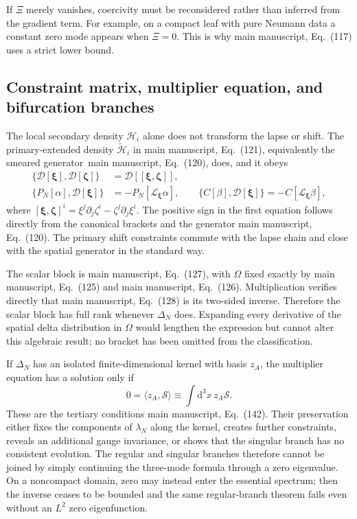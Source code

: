 \documentclass[aps,prd,reprint,onecolumn,notitlepage,nofootinbib,longbibliography,floatfix]{revtex4-2}
\theoremstyle{scstyle}
\theoremstyle{definition}
\theoremstyle{remark}
\newcommand{\dd}{\mathrm{d}}
\newcommand{\cH}{\mathcal H}
\newcommand{\scrS}{\mathcal S}
\newcommand{\Lie}{\mathcal L}
\begin{document}
If $\Xi$ merely vanishes, coercivity must be reconsidered rather than inferred from the gradient term. For example, on a compact leaf with pure Neumann data a constant zero mode appears when $\Xi=0$. This is why main manuscript, Eq.~(117) uses a strict lower bound.

\subsection{Constraint matrix, multiplier equation, and bifurcation branches}
\label{app:constraintmatrix}

The local secondary density $\cH_i$ alone does not transform the lapse or shift. The primary-extended density $\widetilde{\cH}_i$ in main manuscript, Eq.~(121), equivalently the smeared generator~main manuscript, Eq.~(120), does, and it obeys
\begin{align}
\{\mathcal D[\bm\xi],\mathcal D[\bm\zeta]\}
&=\mathcal D[[\bm\xi,\bm\zeta]],
\label{eq:DDalgebra}\\
\{P_N[\alpha],\mathcal D[\bm\xi]\}
&=-P_N[\Lie_{\bm\xi}\alpha],
\qquad
\{C[\beta],\mathcal D[\bm\xi]\}
=-C[\Lie_{\bm\xi}\beta],
\label{eq:Dscalaralgebra}
\end{align}
where $[\bm\xi,\bm\zeta]^i=\xi^j\partial_j\zeta^i-\zeta^j\partial_j\xi^i$. The positive sign in the first equation follows directly from the canonical brackets and the generator main manuscript, Eq.~(120). The primary shift constraints commute with the lapse chain and close with the spatial generator in the standard way.

The scalar block is main manuscript, Eq.~(127), with $\Omega$ fixed exactly by main manuscript, Eq.~(125) and main manuscript, Eq.~(126). Multiplication verifies directly that main manuscript, Eq.~(128) is its two-sided inverse. Therefore the scalar block has full rank whenever $\Delta_N$ does. Expanding every derivative of the spatial delta distribution in $\Omega$ would lengthen the expression but cannot alter this algebraic result; no bracket has been omitted from the classification.

If $\Delta_N$ has an isolated finite-dimensional kernel with basis $z_A$, the multiplier equation has a solution only if
\begin{equation}
0=\langle z_A,\scrS\rangle
\equiv\int\dd^3x\,z_A\scrS.
\label{eq:Fredholmcondition}
\end{equation}
These are the tertiary conditions main manuscript, Eq.~(142). Their preservation either fixes the components of $\lambda_N$ along the kernel, creates further constraints, reveals an additional gauge invariance, or shows that the singular branch has no consistent evolution. The regular and singular branches therefore cannot be joined by simply continuing the three-mode formula through a zero eigenvalue. On a noncompact domain, zero may instead enter the essential spectrum; then the inverse ceases to be bounded and the same regular-branch theorem fails even without an $L^2$ zero eigenfunction.
\end{document}
